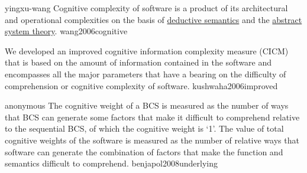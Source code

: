 \documentclass{article}
\begin{document}
\lnQuote
  {yingxu-wang}
  {Cognitive complexity of software is a product of its architectural and operational complexities on the basis of \ul{deductive semantics} and the \ul{abstract system theory}.}
  {wang2006cognitive}

  {We developed an improved cognitive information complexity measure (CICM) that is based on the amount of information contained in the software and encompasses all the major parameters that have a bearing on the difficulty of comprehension or cognitive complexity of software.}
  {kushwaha2006improved}


\lnQuote
  {anonymous}
  {The cognitive weight of a BCS is measured as the number of ways that BCS can generate some factors that make it difficult to comprehend relative to the sequential BCS, of which the cognitive weight is `1'. The value of total cognitive weights of the software is measured as the number of relative ways that software can generate the combination of factors that make the function and semantics difficult to comprehend.}
  {benjapol2008underlying}
\end{document}
